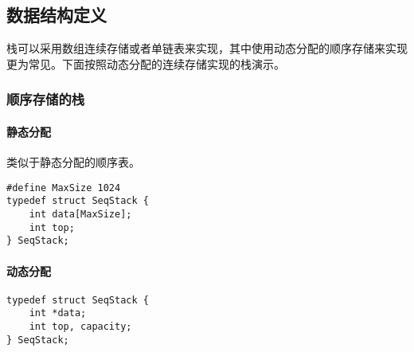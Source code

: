 \documentclass{ctexart}
\begin{document}
\subsection{数据结构定义}
栈可以采用数组连续存储或者单链表来实现，其中使用动态分配的顺序存储来实现更为常见。下面按照动态分配的连续存储实现的栈演示。

\subsubsection{顺序存储的栈}
\paragraph{静态分配} 类似于静态分配的顺序表。
\begin{verbatim}
#define MaxSize 1024
typedef struct SeqStack {
    int data[MaxSize];
    int top;
} SeqStack;
\end{verbatim}

\paragraph{动态分配}
\begin{verbatim}
typedef struct SeqStack {
    int *data;
    int top, capacity;
} SeqStack;
\end{verbatim}
\end{document}
